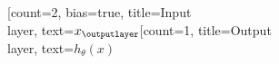 \documentclass{article}
\begin{document}
\begin{neuralnetwork}[height=3]
  \newcommand{\x}[2]{$x_#2$}
  \newcommand{\y}[2]{$h_{\theta}(x)$}
  [count=2, bias=true, title=Input\\layer, text=\x]
  \outputlayer[count=1, title=Output\\layer, text=\y] \linklayers
\end{neuralnetwork}
\end{document}
